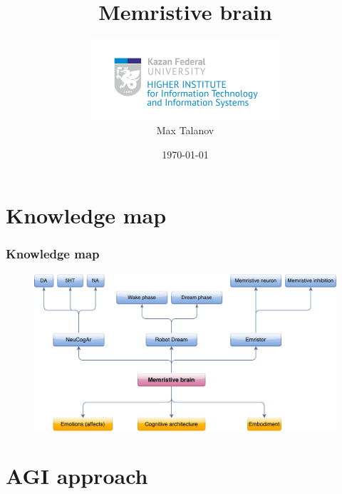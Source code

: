 \documentclass[12pt, aspectratio=169]{beamer}
\title[Memristive brain]{Memristive brain} %
\author[Max Talanov]{
  \includegraphics[height=3cm]{ITIS_logo_bright}\\
  Max Talanov
}
\institute[ITIS: KFU] %
{
Machine cognition lab, Intellectual robotics department, ITIS \\ %
\medskip
\textit{max.talanov@gmail.com} %
}
\date{\today} %
\begin{document}
\begin{frame}
\titlepage %
\end{frame}


\section{Knowledge map}

\begin{frame}
\frametitle{Knowledge map}
\begin{figure}
\includegraphics[width=0.7\linewidth]{knowledge_map}
\end{figure}
\end{frame}

\section{AGI approach}
\end{document}
